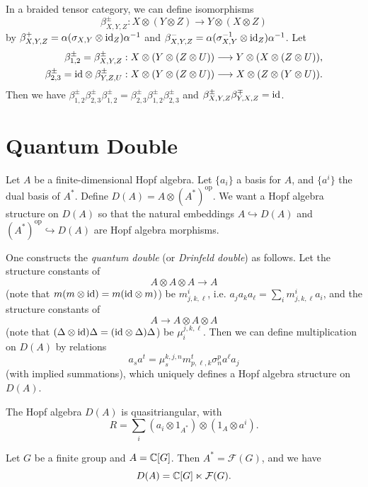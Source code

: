 \begin{corollary}
  In a braided tensor category, we can define
  isomorphisms
  \[
    \beta^{\pm}_{X, Y, Z}
    : X \otimes (Y \otimes Z)
    \longrightarrow
    Y \otimes (X \otimes Z)
  \]
  by $\beta^+_{X, Y, Z} = \alpha(\sigma_{X, Y} \otimes {\operatorname{id}_Z}) \alpha^{-1}$ and
  $\beta^-_{X, Y, Z} = \alpha(\sigma^{-1}_{X, Y} \otimes {\operatorname{id}_Z}) \alpha^{-1}$.
  Let
  \begin{align*}
    \beta^{\pm}_{1, 2}
    = \beta^{\pm}_{X, Y, Z}
    : X \otimes (Y \otimes (Z \otimes U))
    &\longrightarrow
    Y \otimes (X \otimes (Z \otimes U)), \\
    \beta_{2, 3}^{\pm}
    = {\operatorname{id}} \otimes \beta^{\pm}_{Y, Z, U}
    : X \otimes (Y \otimes (Z \otimes U))
    &\longrightarrow
    X \otimes (Z \otimes (Y \otimes U)).
  \end{align*}
  Then we have
  $\beta^{\pm}_{1, 2} \beta^{\pm}_{2, 3} \beta^{\pm}_{1, 2} = \beta^{\pm}_{2, 3} \beta^{\pm}_{1, 2} \beta^{\pm}_{2, 3}$
  and $\beta^{\pm}_{X, Y, Z} \beta^{\mp}_{Y, X, Z} = {\operatorname{id}}$.
\end{corollary}

\section{Quantum Double}

\begin{remark}
  Let $A$ be a finite-dimensional Hopf algebra.
  Let $\{a_i\}$ a basis for $A$, and
  $\{a^i\}$ the dual basis of $A^*$.
  Define $D(A) = A \otimes (A^*)^{\mathrm{op}}$.
  We want a Hopf algebra structure on $D(A)$
  so that the natural embeddings
  $A \hookrightarrow D(A)$ and
  $(A^*)^{\mathrm{op}} \hookrightarrow D(A)$
  are Hopf algebra morphisms.

  One constructs the \emph{quantum double} (or \emph{Drinfeld double})
  as follows. Let the structure constants of
  \[
    A \otimes A \otimes A \longrightarrow A
  \]
  (note that $m(m \otimes {\operatorname{id}}) = m({\operatorname{id}} \otimes m)$)
  be $m^i_{j, k, \ell}$, i.e.
  $a_j a_k a_\ell = \sum_i m^i_{j, k, \ell} a_i$,
  and the structure constants of
  \[
    A \longrightarrow A \otimes A \otimes A
  \]
  (note that $(\Delta \otimes {\operatorname{id}}) \Delta = ({\operatorname{id}} \otimes \Delta) \Delta$)
  be $\mu^{j, k, \ell}_i$. Then we can define
  multiplication on $D(A)$ by
  relations
  \[
    a_s a^t
    = \mu^{k, j, n}_s m^t_{p, \ell, k}
    \sigma^p_n a^\ell a_j
  \]
  (with implied summations),
  which uniquely defines a Hopf algebra
  structure on $D(A)$.
\end{remark}

\begin{theorem}
  The Hopf algebra $D(A)$ is quasitriangular,
  with
  \[
    R = \sum_i (a_i \otimes 1_{A^*}) \otimes (1_A \otimes a^i).
  \]
\end{theorem}

\begin{example}
  Let $G$ be a finite group and $A = \mathbb{C}[G]$.
  Then $A^* = \mathcal{F}(G)$, and we have
  \[
    D(A) 
    = \mathbb{C}[G] \ltimes \mathcal{F}(G).
  \]
\end{example}
